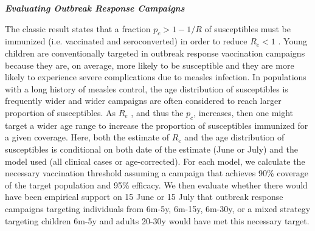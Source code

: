\emph{\textbf{Evaluating Outbreak Response Campaigns}}

The classic result states that a fraction \(p_c \gt 1-1/R\) of susceptibles must be immunized
(i.e. vaccinated and seroconverted) in order to reduce
\(R_e \lt 1\) \cite{Anderson_1981}. Young
children are conventionally targeted in outbreak response vaccination
campaigns because they are, on average, more likely to be susceptible
and they are more likely to experience severe complications due to
measles infection. In populations with a long history of measles
control, the age distribution of susceptibles is frequently wider \cite{23798689} and wider campaigns are often
considered to reach larger proportion of susceptibles. As
\(R_e\) , and thus the \(p_c\),
increases, then one might target a wider age range to increase the
proportion of susceptibles immunized for a given coverage. Here, both
the estimate of \(R_e\) and the age distribution of
susceptibles is conditional on both date of the estimate (June or July)
and the model used (all clinical cases or age-corrected). For each
model, we calculate the necessary vaccination threshold assuming a
campaign that achieves 90\% coverage of the target population and 95\%
efficacy. We then evaluate whether there would have been empirical
support on 15 June or 15 July that outbreak response campaigns targeting
individuals from 6m-5y, 6m-15y, 6m-30y, or a mixed strategy targeting
children 6m-5y and adults 20-30y would have met this necessary target.